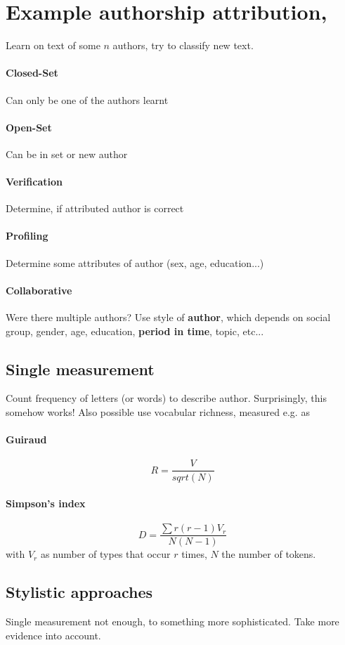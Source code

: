 \documentclass[11pt]{article}
\begin{document}
\section{Example authorship attribution, }
Learn on text of some $n$ authors, try to classify new text. 
\paragraph{Closed-Set} Can only be one of the authors learnt
\paragraph{Open-Set} Can be in set or new author
\paragraph{Verification} Determine, if attributed author is correct
\paragraph{Profiling} Determine some attributes of author (sex, age, education...)
\paragraph{Collaborative} Were there multiple authors?
Use style of \textbf{author}, which depends on social group, gender, age, education, \textbf{period in
time}, topic, etc...
\subsection{Single measurement}
Count frequency of letters (or words) to describe author. Surprisingly, this somehow works!
Also possible use vocabular richness, measured e.g. as 
\paragraph{Guiraud}
\begin{equation}
	R = \frac{V}{sqrt(N)}
\end{equation}
\paragraph{Simpson's index}
\begin{equation}
	D = \frac{\sum r(r-1) V_r}{N(N-1)}
\end{equation}
with $V_r$ as number of types that occur $r$ times, $N$ the number of tokens.
\subsection{Stylistic approaches}
Single measurement not enough, to something more sophisticated. Take more evidence into
account. 
\end{document}
